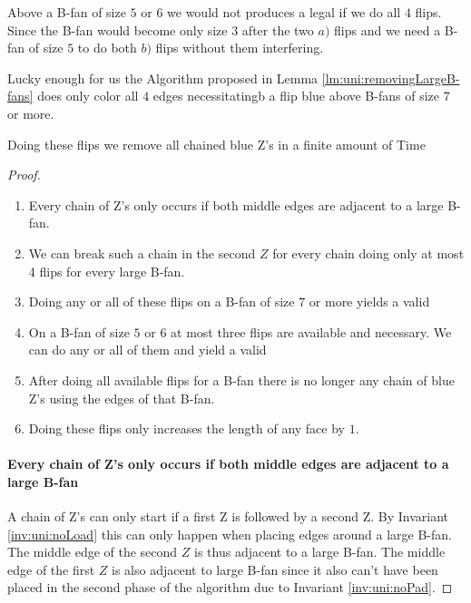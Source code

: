 Above a B-fan of size $5$ or $6$ we would not produces a legal \rel if we do all $4$ flips. Since the B-fan would become only size $3$ after the two $a)$ flips and we need a B-fan of size $5$ to do both $b)$ flips without them interfering.

Lucky enough for us the Algorithm proposed in Lemma \ref{lm:uni:removingLargeB-fans} does only color all $4$ edges necessitatingb a flip blue above B-fans of size $7$ or more.




\begin{lemma}
  \label{lm:uni:flips}
  Doing these flips we remove all chained blue Z's in a finite amount of Time
\end{lemma}

\begin{proof}
  \begin{enumerate}
    \item Every chain of Z's only occurs if both middle edges are adjacent to a large B-fan.
    \item We can break such a chain in the second $Z$ for every chain doing only at most 4 flips for every large B-fan.
    \item Doing any or all of these flips on a B-fan of size $7$ or more yields a valid \rel
    \item On a B-fan of size $5$ or $6$ at most three flips are available and necessary. We can do any or all of them and yield a valid \rel
    \item After doing all available flips for a B-fan there is no longer any chain of blue Z's using the edges of that B-fan.
    \item Doing these flips only increases the length of any face by $1$.
  \end{enumerate}

  \paragraph{Every chain of Z's only occurs if both middle edges are adjacent to a large B-fan}
  A chain of Z's can only start if a first Z is followed by a second Z. By Invariant \ref{inv:uni:noLoad} this can only happen when placing edges around a large B-fan. The middle edge of the second $Z$ is thus adjacent to a large B-fan. The middle edge of the first $Z$ is also adjacent to large B-fan since it also can't have been placed in the second phase of the algorithm due to Invariant \ref{inv:uni:noPad}.


\end{proof}
